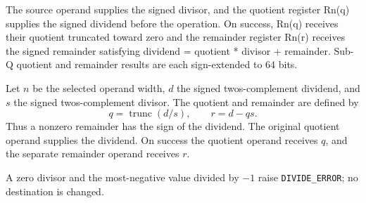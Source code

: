 The source operand supplies the signed divisor, and the quotient register Rn(q) supplies the signed dividend before the operation. On success, Rn(q) receives their quotient truncated toward zero and the remainder register Rn(r) receives the signed remainder satisfying dividend = quotient * divisor + remainder. Sub-Q quotient and remainder results are each sign-extended to 64 bits.

Let \(n\) be the selected operand width, \(d\) the signed two\textquotesingle{}s-complement dividend, and \(s\) the signed two\textquotesingle{}s-complement divisor. The quotient and remainder are defined by
\[
  q = \operatorname{trunc}(d/s),
  \qquad r = d - qs .
\]
Thus a nonzero remainder has the sign of the dividend. The original quotient operand supplies the dividend. On success the quotient operand receives \(q\), and the separate remainder operand receives \(r\).

A zero divisor and the most-negative value divided by \(-1\) raise \texttt{DIVIDE\_ERROR}; no destination is changed.

